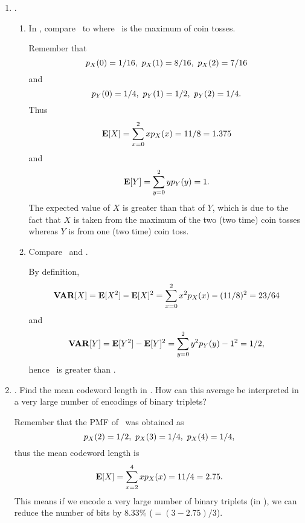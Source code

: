 


%

\usepackage{fullpage}
\usepackage{fancyhdr}

\usepackage{graphicx}

\pagestyle{fancy}

\addtolength{\headsep}{.5cm}




\renewcommand{\emph}[1]{{\it #1}}


\setlength{\headheight}{15pt}
\maketitle

\begin{enumerate}

	\item {}.
	\begin{enumerate}
		\item In ,
		compare \ to  where \X\ is the maximum of coin tosses.
		\ifdefined\sol
		\begin{solution}
		Remember that
		\[ \pmfxk{0} = 1/16,\ \pmfxk{1} = 8/16,\ \pmfxk{2} = 7/16 \]
		and
		\[ \pmfk{Y}{0} = 1/4,\ \pmfk{Y}{1} = 1/2,\ \pmfk{Y}{2} = 1/4. \]
		Thus
		\[ {\bf E}[X] = \sum_{x=0}^2 xp_{X}(x) = 11/8 = 1.375 \]
		and
		\[ {\bf E}[Y] = \sum_{y=0}^2 yp_{Y}(y) = 1.  \]
		The expected value of $X$ is greater than that of $Y$,
		which is due to the fact that
		$X$ is taken from the maximum of the two (two time) coin tosses
		whereas $Y$ is from one (two time) coin toss.
		\end{solution}
		\fi

		\item Compare \ and .
		\ifdefined\sol
		\begin{solution}
		By definition,
		\[
			{\bf VAR}[X] = {\bf E}[X^2] - {\bf E}[X]^2
			= \sum_{x=0}^2 x^2p_{X}(x) - (11/8)^2
			= 23/64
		\]
		and
		\[
			{\bf VAR}[Y] = {\bf E}[Y^2] - {\bf E}[Y]^2
			= \sum_{y=0}^2 y^2p_{Y}(y) - 1^2
			= 1/2,
		\]
		hence \ is greater than .
		\end{solution}
		\fi

	\end{enumerate}


	\item \lgprob{3.24}.
	Find the mean codeword length in \lgprob{3.6}.
	How can this average be interpreted
	in a very large number of encodings of binary triplets?
	\ifdefined\sol
	\begin{solution}
		Remember that the PMF of \X\ was obtained as
		\[ p_{X}(2) = 1/2,\ p_{X}(3) = 1/4,\ p_{X}(4) = 1/4, \]
		thus
		the mean codeword length is
		\[
			{\bf E}[X] = \sum_{x=2}^4 x p_{X}(x) = 11/4 = 2.75.
		\]
		This means
		if we encode a very large number of binary triplets (in \lgprob{3.6}),
		we can reduce the number of bits by 8.33\% ($=(3-2.75)/3$).
	\end{solution}
	\fi



\end{enumerate}
